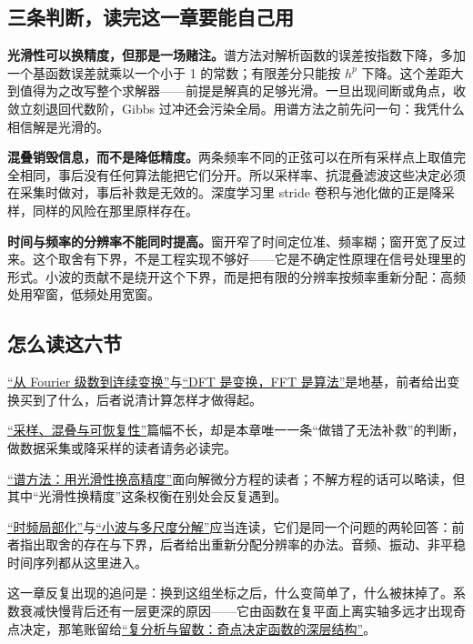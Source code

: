 \subsection{三条判断，读完这一章要能自己用}

\textbf{光滑性可以换精度，但那是一场赌注。}谱方法对解析函数的误差按指数下降，多加一个基函数误差就乘以一个小于 1 的常数；有限差分只能按 \(h^p\) 下降。这个差距大到值得为之改写整个求解器——前提是解真的足够光滑。一旦出现间断或角点，收敛立刻退回代数阶，Gibbs 过冲还会污染全局。用谱方法之前先问一句：我凭什么相信解是光滑的。

\textbf{混叠销毁信息，而不是降低精度。}两条频率不同的正弦可以在所有采样点上取值完全相同，事后没有任何算法能把它们分开。所以采样率、抗混叠滤波这些决定必须在采集时做对，事后补救是无效的。深度学习里 stride 卷积与池化做的正是降采样，同样的风险在那里原样存在。

\textbf{时间与频率的分辨率不能同时提高。}窗开窄了时间定位准、频率糊；窗开宽了反过来。这个取舍有下界，不是工程实现不够好——它是不确定性原理在信号处理里的形式。小波的贡献不是绕开这个下界，而是把有限的分辨率按频率重新分配：高频处用窄窗，低频处用宽窗。

\subsection{怎么读这六节}

\hyperref[sec:08-Numerical-Analysis/08-Fourier-and-Spectral-Methods/01]{``从 Fourier 级数到连续变换''}与\hyperref[sec:08-Numerical-Analysis/08-Fourier-and-Spectral-Methods/03]{``DFT 是变换，FFT 是算法''}是地基，前者给出变换买到了什么，后者说清计算怎样才做得起。

\hyperref[sec:08-Numerical-Analysis/08-Fourier-and-Spectral-Methods/02]{``采样、混叠与可恢复性''}篇幅不长，却是本章唯一一条``做错了无法补救''的判断，做数据采集或降采样的读者请务必读完。

\hyperref[sec:08-Numerical-Analysis/08-Fourier-and-Spectral-Methods/04]{``谱方法：用光滑性换高精度''}面向解微分方程的读者；不解方程的话可以略读，但其中``光滑性换精度''这条权衡在别处会反复遇到。

\hyperref[sec:08-Numerical-Analysis/08-Fourier-and-Spectral-Methods/05]{``时频局部化''}与\hyperref[sec:08-Numerical-Analysis/08-Fourier-and-Spectral-Methods/06]{``小波与多尺度分解''}应当连读，它们是同一个问题的两轮回答：前者指出取舍的存在与下界，后者给出重新分配分辨率的办法。音频、振动、非平稳时间序列都从这里进入。

这一章反复出现的追问是：换到这组坐标之后，什么变简单了，什么被抹掉了。系数衰减快慢背后还有一层更深的原因——它由函数在复平面上离实轴多远才出现奇点决定，那笔账留给\hyperref[ch:069]{``复分析与留数：奇点决定函数的深层结构''}。
